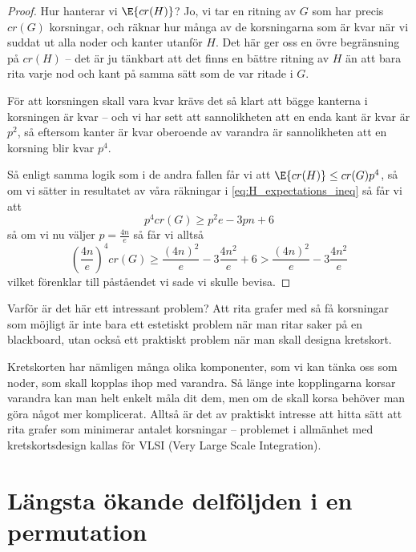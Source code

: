 \documentclass[nobib]{tufte-handout}
\begin{document}
\begin{theorem}
\begin{proof}
    Hur hanterar vi $\E{cr(H)}$? Jo, vi tar en ritning av $G$ som har precis $cr(G)$ korsningar, och räknar hur många av de korsningarna som är kvar när vi suddat ut alla noder och kanter utanför $H$. Det här ger oss en övre begränsning på $cr(H)$ -- det är ju tänkbart att det finns en bättre ritning av $H$ än att bara rita varje nod och kant på samma sätt som de var ritade i $G$.

    För att korsningen skall vara kvar krävs det så klart att bägge kanterna i korsningen är kvar -- och vi har sett att sannolikheten att en enda kant är kvar är $p^2$, så eftersom kanter är kvar oberoende av varandra är sannolikheten att en korsning blir kvar $p^4$.

    Så enligt samma logik som i de andra fallen får vi att $\E{cr(H)} \leq cr(G)p^4$, så om vi sätter in resultatet av våra räkningar i \eqref{eq:H_expectations_ineq} så får vi att
    $$p^4cr(G) \geq p^2e - 3pn + 6$$
    så om vi nu väljer $p = \frac{4n}{e}$ så får vi alltså
    $$\left(\frac{4n}{e}\right)^4 cr(G) \geq \frac{(4n)^2}{e} - 3\frac{4n^2}{e} + 6 > \frac{(4n)^2}{e} - 3\frac{4n^2}{e}$$
    vilket förenklar till påståendet vi sade vi skulle bevisa.
  \end{proof}
\end{theorem}

Varför är det här ett intressant problem? Att rita grafer med så få korsningar som möjligt är inte bara ett estetiskt problem när man ritar saker på en blackboard, utan också ett praktiskt problem när man skall designa kretskort.

Kretskorten har nämligen många olika komponenter, som vi kan tänka oss som noder, som skall kopplas ihop med varandra. Så länge inte kopplingarna korsar varandra kan man helt enkelt måla dit dem, men om de skall korsa behöver man göra något mer komplicerat. Alltså är det av praktiskt intresse att hitta sätt att rita grafer som minimerar antalet korsningar -- problemet i allmänhet med kretskortsdesign kallas för VLSI (Very Large Scale Integration).

\section{Längsta ökande delföljden i en permutation}
\end{document}
